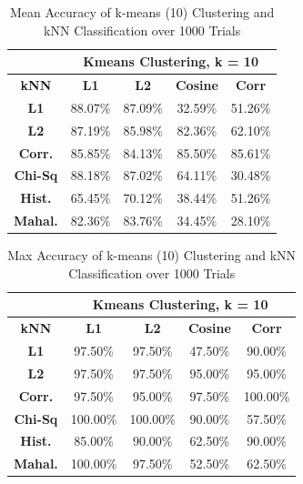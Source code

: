\documentclass[10pt,twocolumn,letterpaper]{article}
\begin{document}
\begin{table}[H]
\caption{Mean Accuracy of k-means (10) Clustering and kNN Classification over 1000 Trials \label{tab:kmeans10}}
\small
\begin{center}
\begin{tabular}{|c| c c c c|}
\cline{2-5}
\multicolumn{1}{c|}{ } & \multicolumn{4}{|c|}{\bf Kmeans Clustering, k = 10} \\
\hline

\bf kNN &\bf L1 &\bf L2 &\bf Cosine &\bf Corr \\ [0.5ex]
\hline
\bf L1 & 88.07\% & 87.09\%  & 32.59\% & 51.26\%\\ [0.5ex]
\hline
\bf L2 & 87.19\% & 85.98\%  & 82.36\% & 62.10\%\\ [0.5ex]
\hline
\bf Corr. & 85.85\% & 84.13\%  & 85.50\% & 85.61\%\\ [0.5ex]
\hline
\bf Chi-Sq & 88.18\% & 87.02\%  & 64.11\% & 30.48\%\\ [0.5ex]
\hline
\bf Hist. & 65.45\% & 70.12\%  & 38.44\% & 51.26\%\\ [0.5ex]
\hline
\bf Mahal. & 82.36\% & 83.76\% & 34.45\% & 28.10\%\\ [0.5ex]
\hline
\end{tabular}
\end{center}
\end{table}

\begin{table}[H]
\caption{Max Accuracy of k-means (10) Clustering and kNN Classification over 1000 Trials \label{tab:kmeans_max10}}
\small
\begin{center}
\begin{tabular}{|c| c c c c|}
\cline{2-5}
\multicolumn{1}{c|}{ } & \multicolumn{4}{|c|}{\bf Kmeans Clustering, k = 10} \\
\hline

\bf kNN &\bf L1 &\bf L2 &\bf Cosine &\bf Corr \\ [0.5ex]
\hline
\bf L1 & 97.50\% & 97.50\%  & 47.50\% & 90.00\%\\ [0.5ex]
\hline
\bf L2 & 97.50\% & 97.50\%  & 95.00\% & 95.00\%\\ [0.5ex]
\hline
\bf Corr. & 97.50\% & 95.00\%  & 97.50\% & 100.00\%\\ [0.5ex]
\hline
\bf Chi-Sq & 100.00\% & 100.00\%  & 90.00\% & 57.50\%\\ [0.5ex]
\hline
\bf Hist. & 85.00\% & 90.00\%  & 62.50\% & 90.00\%\\ [0.5ex]
\hline
\bf Mahal. & 100.00\% & 97.50\% & 52.50\% & 62.50\%\\ [0.5ex]
\hline
\end{tabular}
\end{center}
\end{table}
\end{document}
